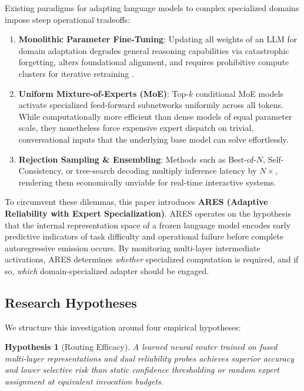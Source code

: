 \documentclass[journal,10pt,twocolumn]{IEEEtran}
\newtheorem{hypothesis}{Hypothesis}
\begin{document}
Existing paradigms for adapting language models to complex specialized domains impose steep operational tradeoffs:
\begin{enumerate}
    \item \textbf{Monolithic Parameter Fine-Tuning}: Updating all weights of an LLM for domain adaptation degrades general reasoning capabilities via catastrophic forgetting, alters foundational alignment, and requires prohibitive compute clusters for iterative retraining \cite{hu2022lora, dou2023loramoe}.
    \item \textbf{Uniform Mixture-of-Experts (MoE)}: Top-$k$ conditional MoE models \cite{shazeer2017moe, fedus2022switch, jiang2024mixtral} activate specialized feed-forward subnetworks uniformly across all tokens. While computationally more efficient than dense models of equal parameter scale, they nonetheless force expensive expert dispatch on trivial, conversational inputs that the underlying base model can solve effortlessly.
    \item \textbf{Rejection Sampling \& Ensembling}: Methods such as Best-of-$N$, Self-Consistency, or tree-search decoding multiply inference latency by $N \times$, rendering them economically unviable for real-time interactive systems.
\end{enumerate}

To circumvent these dilemmas, this paper introduces \textbf{ARES (Adaptive Reliability with Expert Specialization)}. ARES operates on the hypothesis that the internal representation space of a frozen language model encodes early predictive indicators of task difficulty and operational failure before complete autoregressive emission occurs. By monitoring multi-layer intermediate activations, ARES determines \textit{whether} specialized computation is required, and if so, \textit{which} domain-specialized adapter should be engaged.

\subsection{Research Hypotheses}
We structure this investigation around four empirical hypotheses:
\begin{hypothesis}[Routing Efficacy]
A learned neural router trained on fused multi-layer representations and dual reliability probes achieves superior accuracy and lower selective risk than static confidence thresholding or random expert assignment at equivalent invocation budgets.
\end{hypothesis}
\end{document}
